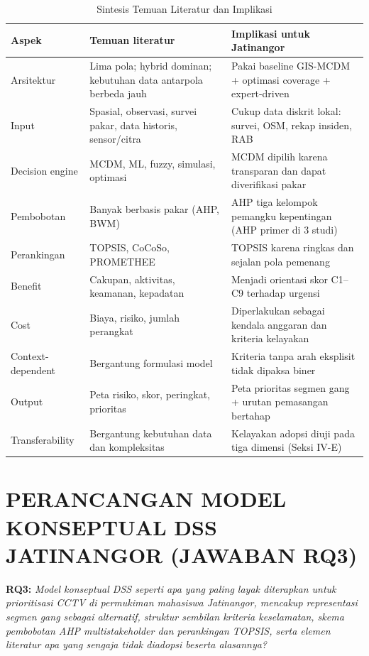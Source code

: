 \documentclass[conference]{IEEEtran}
\begin{document}
\begin{table}[!t]
\caption{Sintesis Temuan Literatur dan Implikasi}
\label{tab:sintesis}
\centering
\begin{tabular}{p{1.5cm}p{3.0cm}p{3.1cm}}
\toprule
\textbf{Aspek} & \textbf{Temuan literatur} & \textbf{Implikasi untuk Jatinangor} \\
\midrule
Arsitektur & Lima pola; hybrid dominan; kebutuhan data antarpola berbeda jauh & Pakai baseline GIS-MCDM + optimasi coverage + expert-driven \\
Input & Spasial, observasi, survei pakar, data historis, sensor/citra & Cukup data diskrit lokal: survei, OSM, rekap insiden, RAB \\
Decision engine & MCDM, ML, fuzzy, simulasi, optimasi & MCDM dipilih karena transparan dan dapat diverifikasi pakar \\
Pembobotan & Banyak berbasis pakar (AHP, BWM) & AHP tiga kelompok pemangku kepentingan (AHP primer di 3 studi) \\
Perankingan & TOPSIS, CoCoSo, PROMETHEE & TOPSIS karena ringkas dan sejalan pola pemenang \cite{kanj2024} \\
Benefit & Cakupan, aktivitas, keamanan, kepadatan & Menjadi orientasi skor C1--C9 terhadap urgensi \\
Cost & Biaya, risiko, jumlah perangkat & Diperlakukan sebagai kendala anggaran dan kriteria kelayakan \\
Context-dependent & Bergantung formulasi model & Kriteria tanpa arah eksplisit tidak dipaksa biner \\
Output & Peta risiko, skor, peringkat, prioritas & Peta prioritas segmen gang + urutan pemasangan bertahap \\
Transferability & Bergantung kebutuhan data dan kompleksitas & Kelayakan adopsi diuji pada tiga dimensi (Seksi IV-E) \\
\bottomrule
\end{tabular}
\end{table}

\section{PERANCANGAN MODEL KONSEPTUAL DSS JATINANGOR (JAWABAN RQ3)}

\noindent\textbf{RQ3:} \textit{Model konseptual DSS seperti apa yang paling layak diterapkan untuk prioritisasi CCTV di permukiman mahasiswa Jatinangor, mencakup representasi segmen gang sebagai alternatif, struktur sembilan kriteria keselamatan, skema pembobotan AHP multistakeholder dan perankingan TOPSIS, serta elemen literatur apa yang sengaja tidak diadopsi beserta alasannya?}
\end{document}
